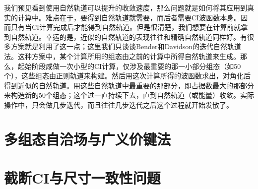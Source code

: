 我们预见看到使用自然轨道可以提升的收敛速度，那么问题就是如何将其应用到真实的计算中。难点在于，要得到自然轨道就需要，而后者需要CI波函数本身。因而只有当CI计算完成后才能得到自然轨道。但是很清楚，我们想要在计算前就拿到自然轨道。幸运的是，近似的自然轨道的表现往往和精确自然轨道同样好。有很多方案就是利用了这一点；这里我们只谈谈Bender和Davidson的迭代自然轨道法。这种方案中，某个计算所用的组态由之前的计算中所得自然轨道来生成。那么，起始阶段咸做一次小型的CI计算，仅涉及最重要的那一小部分组态（如50个），这些组态由正则\hft 轨道来构建。然后用这次计算所得的波函数求出，对角化后得到近似的自然轨道。用这些自然轨道中最重要的那部分，即占据数最大的那部分来构造新的50个组态；这个过一直持续下去，直到自然轨道（或能量）收敛。实际操作中，只会做几步迭代，而且往往几步迭代之后这个过程就开始发散了。
\section{多组态自洽场与广义价键法}
\section{截断CI与尺寸一致性问题}

\theendnotes